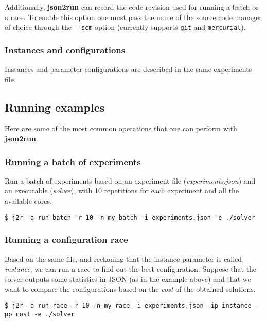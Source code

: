 \documentclass[11pt,notitlepage,twoside,a4paper]{article}
\begin{document}
Additionally, \textbf{json2run} can record the code revision used for
running a batch or a race. To enable this option one must pass the name
of the source code manager of choice through the \texttt{-{}-scm} option
(currently supports \texttt{git} and \texttt{mercurial}).

\subsubsection{Instances and configurations}

Instances and parameter configurations are described in the same
experiments file.

\subsection{Running examples}

Here are some of the most common operations that one can perform with
\textbf{json2run}.

\subsubsection{Running a batch of experiments}

Run a batch of experiments based on an experiment file
(\emph{experiments.json}) and an executable (\emph{solver}), with 10
repetitions for each experiment and all the available cores.

\begin{scriptsize}
\begin{lstlisting}
$ j2r -a run-batch -r 10 -n my_batch -i experiments.json -e ./solver
\end{lstlisting}
\end{scriptsize}

\subsubsection{Running a configuration race}

Based on the same file, and reckoning that the instance parameter is
called \emph{instance}, we can run a race to find out the best
configuration. Suppose that the solver outputs some statistics in JSON
(as in the example above) and that we want to compare the configurations
based on the \emph{cost} of the obtained solutions.

\begin{scriptsize}
\begin{lstlisting}
$ j2r -a run-race -r 10 -n my_race -i experiments.json -ip instance -pp cost -e ./solver
\end{lstlisting}
\end{scriptsize}
\end{document}
